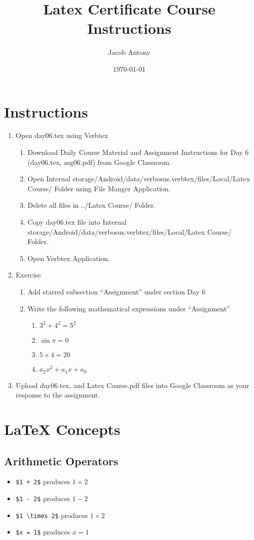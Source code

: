 \documentclass{article}
\title{Latex Certificate Course Instructions}
\author{Jacob Antony}
\date{\today}
\begin{document}
\maketitle

\section*{Instructions}
\begin{enumerate}
	\item Open day06.tex using Verbtex
	\begin{enumerate}
		\item Download Daily Course Material and Assignment Instructions for Day 6 (day06.tex, asg06.pdf) from Google Classroom.
		\item Open Internal storage/Android/data/verbosus.verbtex/files/Local/Latex Course/ Folder using File Manger Application.
		\item Delete all files in ../Latex Course/ Folder.
		\item Copy day06.tex file into Internal storage/Android/data/verbosus.verbtex/files/Local/Latex Course/  Folder.
		\item Open Verbtex Application.
	\end{enumerate}
	\item Exercise
	\begin{enumerate}
		\item Add starred subsection ``Assignment'' under section Day 6
		\item Write the following mathematical expressions under ``Assignment''
		\begin{enumerate}
			\item $3^2+4^2=5^2$
			\item $\sin \pi = 0$
			\item $5 \times 4 = 20$
			\item $a_2x^2 + a_1x+a_0$
		\end{enumerate}
	\end{enumerate}
	\item Upload day06.tex, and Latex Course.pdf files into Google Classroom as your response to the assignment.
\end{enumerate}

\section{\LaTeX{} Concepts}

\subsection{Arithmetic Operators}
\begin{itemize}
	\item \texttt{\$1 + 2\$} produces $1 + 2$
	\item \texttt{\$1 - 2\$} produces $1 - 2$
	\item \texttt{\$1 \textbackslash{}times 2\$} produces $1 \times 2$
	\item \texttt{\$x = 1\$} produces $x = 1$
\end{itemize}
\end{document}
